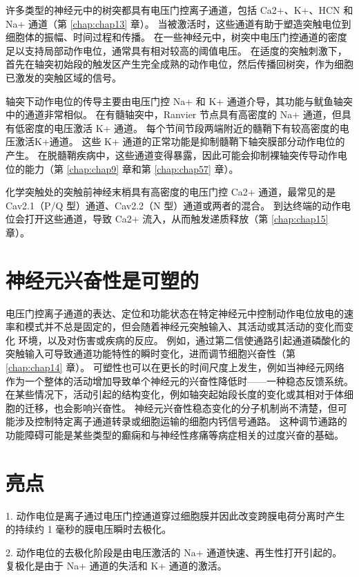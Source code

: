 许多类型的神经元中的树突都具有电压门控离子通道，包括 Ca2+、K+、HCN 和 Na+ 通道（第 \ref{chap:chap13} 章）。 
当被激活时，这些通道有助于塑造突触电位到细胞体的振幅、时间过程和传播。 
在一些神经元中，树突中电压门控通道的密度足以支持局部动作电位，通常具有相对较高的阈值电压。 
在适度的突触刺激下，首先在轴突初始段的触发区产生完全成熟的动作电位，然后传播回树突，作为细胞已激发的突触区域的信号。


轴突下动作电位的传导主要由电压门控 Na+ 和 K+ 通道介导，其功能与鱿鱼轴突中的通道非常相似。 
在有髓轴突中，Ranvier 节点具有高密度的 Na+ 通道，但具有低密度的电压激活 K+ 通道。 
每个节间节段两端附近的髓鞘下有较高密度的电压激活K+通道。 
这些 K+ 通道的正常功能是抑制髓鞘下轴突膜部分动作电位的产生。 
在脱髓鞘疾病中，这些通道变得暴露，因此可能会抑制裸轴突传导动作电位的能力（第 \ref{chap:chap9} 章和第 \ref{chap:chap57} 章）。


化学突触处的突触前神经末梢具有高密度的电压门控 Ca2+ 通道，最常见的是 Cav2.1（P/Q 型）通道、Cav2.2（N 型）通道或两者的混合。 
到达终端的动作电位会打开这些通道，导致 Ca2+ 流入，从而触发递质释放（第 \ref{chap:chap15} 章）。


\section{神经元兴奋性是可塑的}

电压门控离子通道的表达、定位和功能状态在特定神经元中控制动作电位放电的速率和模式并不总是固定的，但会随着神经元突触输入、其活动或其活动的变化而变化 环境，以及对伤害或疾病的反应。 
例如，通过第二信使通路引起通道磷酸化的突触输入可导致通道功能特性的瞬时变化，进而调节细胞兴奋性（第 \ref{chap:chap14} 章）。 
可塑性也可以在更长的时间尺度上发生，例如当神经元网络作为一个整体的活动增加导致单个神经元的兴奋性降低时——一种稳态反馈系统。 
在某些情况下，活动引起的结构变化，例如轴突起始段长度的变化或其相对于体细胞的迁移，也会影响兴奋性。 
神经元兴奋性稳态变化的分子机制尚不清楚，但可能涉及控制特定离子通道转录或细胞运输的细胞内钙信号通路。 
这种调节通路的功能障碍可能是某些类型的癫痫和与神经性疼痛等病症相关的过度兴奋的基础。




\section{亮点}

1. 动作电位是离子通过电压门控通道穿过细胞膜并因此改变跨膜电荷分离时产生的持续约 1 毫秒的膜电压瞬时去极化。 


2. 动作电位的去极化阶段是由电压激活的 Na+ 通道快速、再生性打开引起的。 
复极化是由于 Na+ 通道的失活和 K+ 通道的激活。 


